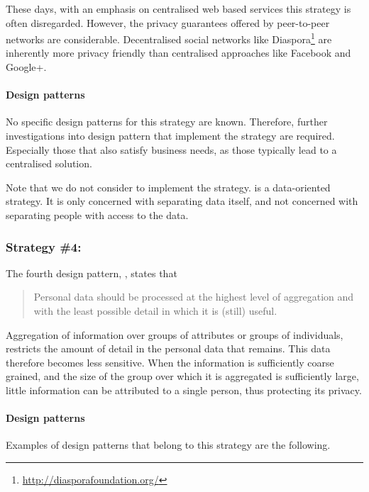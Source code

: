 These days, with an emphasis on centralised web based services this strategy is often disregarded. However, the privacy guarantees offered by peer-to-peer networks are considerable. Decentralised social networks like Diaspora\footnote{\url{http://diasporafoundation.org/}
}
are inherently more privacy friendly than centralised approaches like Facebook and Google+. 


\paragraph{Design patterns}

No specific design patterns for this strategy are known.  Therefore, further investigations into design pattern that implement the  strategy are required. Especially those that also satisfy business needs, as those typically lead to a centralised solution.

Note that we do not consider  to implement the  strategy.  is a data-oriented strategy. It is only concerned with separating data itself, and not concerned with separating people with access to the data.


\subsubsection{Strategy \#4: } 

The fourth design pattern, , states that 
\begin{quote}
Personal data should be processed at the highest level of aggregation and with the least possible detail in which it is (still) useful.
\end{quote}
Aggregation of information over groups of attributes or groups of individuals, restricts the amount of detail in the personal data that remains. This data therefore becomes less sensitive. When the information is sufficiently coarse grained, and the size of the group over which it is aggregated is sufficiently large, little information can be attributed to a single person, thus protecting its privacy.

\paragraph{Design patterns}

Examples of design patterns that belong to this strategy are the following.

